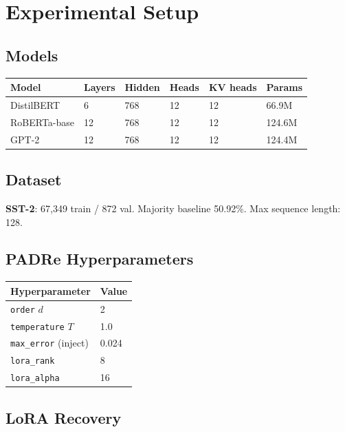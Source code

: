\section{Experimental Setup}

\subsection{Models}

\begin{table}[H]
\centering
\small
\begin{tabular}{llllll}
\toprule
\textbf{Model} & \textbf{Layers} & \textbf{Hidden} & \textbf{Heads} & \textbf{KV heads} & \textbf{Params} \\
\midrule
DistilBERT & 6 & 768 & 12 & 12 & 66.9M \\
RoBERTa-base & 12 & 768 & 12 & 12 & 124.6M \\
GPT-2 & 12 & 768 & 12 & 12 & 124.4M \\
\bottomrule
\end{tabular}
\end{table}

\subsection{Dataset}

\textbf{SST-2}: 67,349 train / 872 val. Majority baseline 50.92\%. 
Max sequence length: 128.

\subsection{PADRe Hyperparameters}

\begin{table}[H]
\centering
\small
\begin{tabular}{ll}
\toprule
\textbf{Hyperparameter} & \textbf{Value} \\
\midrule
\texttt{order} $d$ & 2 \\
\texttt{temperature} $T$ & 1.0 \\
\texttt{max\_error} (inject) & 0.024 \\
\texttt{lora\_rank} & 8 \\
\texttt{lora\_alpha} & 16 \\
\bottomrule
\end{tabular}
\end{table}

\subsection{LoRA Recovery}

